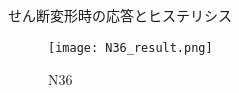 \begin{columns}[totalwidth=.85\linewidth]
	\column{\textwidth}
	\vspace{-10mm}
		\begin{itembox}[l]{せん断変形時の応答とヒステリシス}
			\begin{figure}[htb]
				\centering
					\texttt{[image: N36\_result.png]}
					\caption{N36}
					\label{4_N36}
			\end{figure}


		\end{itembox}


\end{columns}
